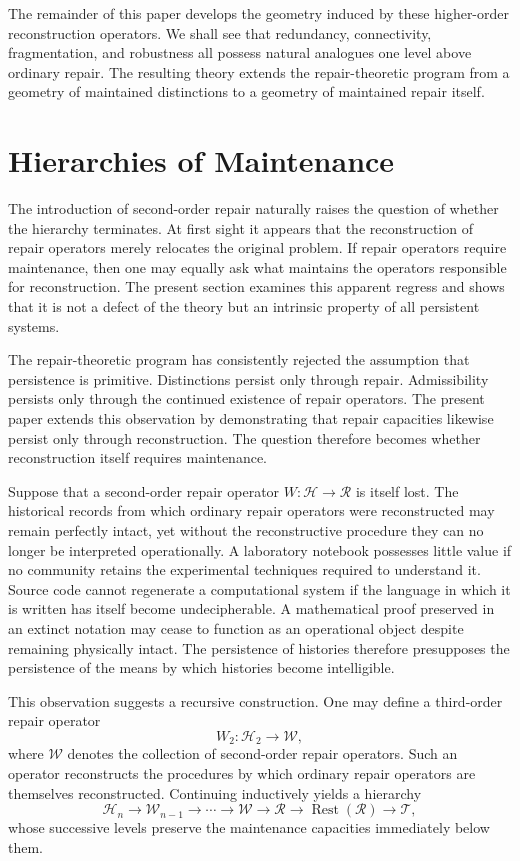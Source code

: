 \documentclass[12pt,oneside]{article}
\theoremstyle{plain}
\theoremstyle{definition}
\theoremstyle{remark}
\theoremstyle{plain}
\DeclareMathOperator{\Rest}{Rest}
\newcommand{\Hist}{\mathcal{H}}
\newcommand{\Witness}{\mathcal{W}}
\newcommand{\Tsub}{\mathcal{T}}
\begin{document}
The remainder of this paper develops the geometry induced by these higher-order reconstruction
operators. We shall see that redundancy, connectivity, fragmentation, and robustness all possess
natural analogues one level above ordinary repair. The resulting theory extends the repair-theoretic
program from a geometry of maintained distinctions to a geometry of maintained repair itself.

\section{Hierarchies of Maintenance}

The introduction of second-order repair naturally raises the question of whether the hierarchy
terminates. At first sight it appears that the reconstruction of repair operators merely relocates
the original problem. If repair operators require maintenance, then one may equally ask what
maintains the operators responsible for reconstruction. The present section examines this apparent
regress and shows that it is not a defect of the theory but an intrinsic property of all persistent
systems.

The repair-theoretic program has consistently rejected the assumption that persistence is primitive.
Distinctions persist only through repair. Admissibility persists only through the continued
existence of repair operators. The present paper extends this observation by demonstrating that
repair capacities likewise persist only through reconstruction. The question therefore becomes
whether reconstruction itself requires maintenance.

Suppose that a second-order repair operator $W : \Hist \rightarrow \mathcal{R}$ is itself lost.
The historical records from which ordinary repair operators were reconstructed may remain perfectly
intact, yet without the reconstructive procedure they can no longer be interpreted operationally.
A laboratory notebook possesses little value if no community retains the experimental techniques
required to understand it. Source code cannot regenerate a computational system if the language in
which it is written has itself become undecipherable. A mathematical proof preserved in an extinct
notation may cease to function as an operational object despite remaining physically intact. The
persistence of histories therefore presupposes the persistence of the means by which histories
become intelligible.

This observation suggests a recursive construction. One may define a third-order repair operator
\[
W_2 : \Hist_2 \rightarrow \Witness,
\]
where $\Witness$ denotes the collection of second-order repair operators. Such an operator
reconstructs the procedures by which ordinary repair operators are themselves reconstructed.
Continuing inductively yields a hierarchy
\[
\Hist_n
\longrightarrow
\mathcal{W}_{n-1}
\longrightarrow
\cdots
\longrightarrow
\Witness
\longrightarrow
\mathcal{R}
\longrightarrow
\Rest(\mathcal{R})
\longrightarrow
\Tsub,
\]
whose successive levels preserve the maintenance capacities immediately below them.
\end{document}
